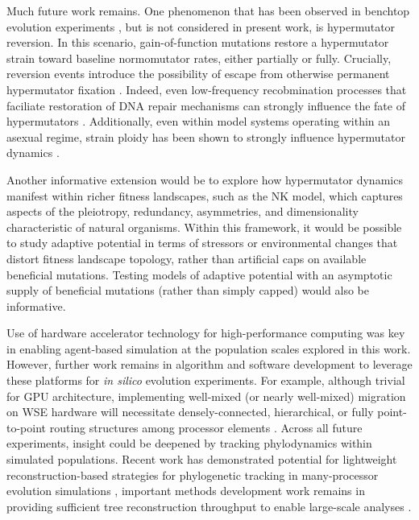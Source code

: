 Much future work remains.
One phenomenon that has been observed in benchtop evolution experiments \citep{ho2021evolutionary}, but is not considered in present work, is hypermutator reversion.
In this scenario, gain-of-function mutations restore a hypermutator strain toward baseline normomutator rates, either partially or fully.
Crucially, reversion events introduce the possibility of escape from otherwise permanent hypermutator fixation \citep{taddei1997role}.
Indeed, even low-frequency recobmination processes that faciliate restoration of DNA repair mechanisms can strongly influence the fate of hypermutators \citep{tenaillon2000mutators}.
Additionally, even within model systems operating within an asexual regime, strain ploidy has been shown to strongly influence hypermutator dynamics \citep{thompson2006ploidy}.

Another informative extension would be to explore how hypermutator dynamics manifest within richer fitness landscapes, such as the NK model, which captures aspects of the pleiotropy, redundancy, asymmetries, and dimensionality characteristic of natural organisms.
Within this framework, it would be possible to study adaptive potential in terms of stressors or environmental changes that distort fitness landscape topology, rather than artificial caps on available beneficial mutations.
Testing models of adaptive potential with an asymptotic supply of beneficial mutations (rather than simply capped) would also be informative.

Use of hardware accelerator technology for high-performance computing was key in enabling agent-based simulation at the population scales explored in this work.
However, further work remains in algorithm and software development to leverage these platforms for \textit{in silico} evolution experiments.
For example, although trivial for GPU architecture, implementing well-mixed (or nearly well-mixed) migration on WSE hardware will necessitate densely-connected, hierarchical, or fully point-to-point routing structures among processor elements \citep{james2020physical,luczynski2024near}.
Across all future experiments, insight could be deepened by tracking phylodynamics within simulated populations.
Recent work has demonstrated potential for lightweight reconstruction-based strategies for phylogenetic tracking in many-processor evolution simulations \citep{moreno2022hereditary}, important methods development work remains in providing sufficient tree reconstruction throughput to enable large-scale analyses \citep{moreno2024trackable}.

